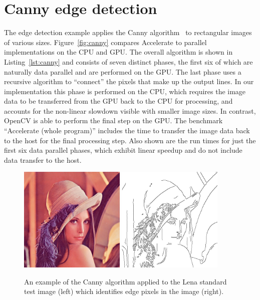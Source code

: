 \section{Canny edge detection}
\label{sec:canny}

The edge detection example applies the Canny algorithm~\cite{Canny:1986et} to
rectangular images of various sizes. Figure~\ref{fig:canny} compares Accelerate
to parallel implementations on the CPU and GPU\@. The overall algorithm is shown
in Listing~\ref{lst:canny} and consists of seven distinct phases, the first six
of which are naturally data parallel and are performed on the GPU\@. The last
phase uses a recursive algorithm to ``connect'' the pixels that make up the
output lines. In our implementation this phase is performed on the CPU, which
requires the image data to be transferred from the GPU back to the CPU for
processing, and accounts for the non-linear slowdown visible with smaller image
sizes. In contrast, OpenCV is able to perform the final step on the GPU\@. The
benchmark ``Accelerate (whole program)'' includes the time to transfer the image
data back to the host for the final processing step. Also shown are the run
times for just the first six data parallel phases, which exhibit linear speedup
and do not include data transfer to the host.

\begin{figure}
    \begin{center}
        \includegraphics[width=0.45\textwidth]{images/sec-6/canny/lena}
        \includegraphics[width=0.45\textwidth]{images/sec-6/canny/lena-edges}
    \end{center}
    \caption[Example of the Canny edge detection algorithm]{An example of the
        Canny algorithm applied to the Lena standard test image (left) which
        identifies edge pixels in the image (right).}
    \label{fig:lena}
\end{figure}

